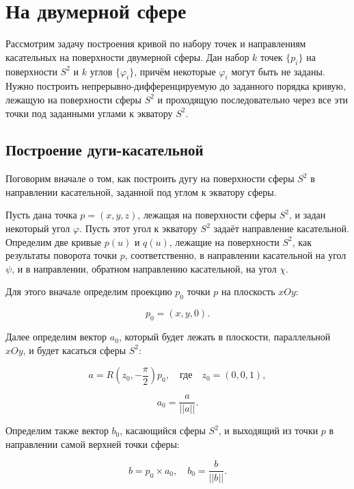 \section{На двумерной сфере}

Рассмотрим задачу построения кривой по набору точек и направлениям касательных на поверхности двумерной сферы.
Дан набор $k$ точек $\{p_i\}$ на поверхности $S^2$ и $k$ углов $\{\varphi_i\}$, причём некоторые $\varphi_i$ могут быть
не заданы. Нужно построить непрерывно-дифференцируемую до заданного порядка кривую, лежащую на поверхности сферы $S^2$ и
проходящую последовательно через все эти точки под заданными углами к экватору $S^2$.

\subsection*{Построение дуги-касательной}

Поговорим вначале о том, как построить дугу на поверхности сферы $S^2$ в направлении касательной, заданной под углом к
экватору сферы.

Пусть дана точка $p=(x,y,z)$, лежащая на поверхности сферы $S^2$, и задан некоторый угол $\varphi$. Пусть этот угол к
экватору $S^2$ задаёт направление касательной. Определим две кривые $p(u)$ и $q(u)$, лежащие на поверхности $S^2$,
как результаты поворота точки $p$, соответственно, в направлении касательной на угол $\psi$, и в направлении,
обратном направлению касательной, на угол $\chi$.

Для этого вначале определим проекцию $p_0$ точки $p$ на плоскость $xOy$:

$$
p_0=(x,y,0).
$$

Далее определим вектор $a_0$, который будет лежать в плоскости, параллельной $xOy$, и будет касаться сферы $S^2$:

$$
a=R(z_0,-\frac{\pi}{2})p_0, \quad \text{где} \quad z_0=(0,0,1),
$$

\begin{equation}
a_0=\frac{a}{||a||}.
\label{two-dimension-tangent-axis-1}
\end{equation}

Определим также вектор $b_0$, касающийся сферы $S^2$, и выходящий из точки $p$ в направлении самой верхней точки сферы:

\begin{equation}
b=p_0 \times a_0, \quad b_0=\frac{b}{||b||}.
\label{two-dimension-tangent-axis-2}
\end{equation}

